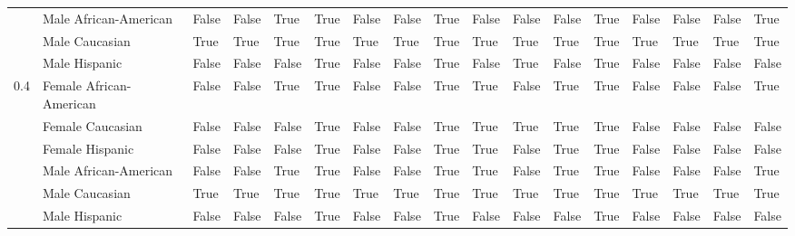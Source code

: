 \begin{tabular}{lllllllllllllllll}
    & Male African-American &       False &          False &        True &           True &       False &                  False &        True &           False &       False &       False &              True &         False &               False &                False &        True \\
    & Male Caucasian &        True &           True &        True &           True &        True &                   True &        True &            True &        True &        True &              True &          True &                True &                 True &        True \\
    & Male Hispanic &       False &          False &       False &           True &       False &                  False &        True &           False &        True &       False &              True &         False &               False &                False &       False \\
0.4 & Female African-American &       False &          False &        True &           True &       False &                  False &        True &            True &       False &        True &              True &         False &               False &                False &        True \\
    & Female Caucasian &       False &          False &       False &           True &       False &                  False &        True &            True &        True &        True &              True &         False &               False &                False &       False \\
    & Female Hispanic &       False &          False &       False &           True &       False &                  False &        True &            True &       False &        True &              True &         False &               False &                False &       False \\
    & Male African-American &       False &          False &        True &           True &       False &                  False &        True &            True &       False &        True &              True &         False &               False &                False &        True \\
    & Male Caucasian &        True &           True &        True &           True &        True &                   True &        True &            True &        True &        True &              True &          True &                True &                 True &        True \\
    & Male Hispanic &       False &          False &       False &           True &       False &                  False &        True &           False &       False &       False &              True &         False &               False &                False &       False \\
\bottomrule
\end{tabular}
